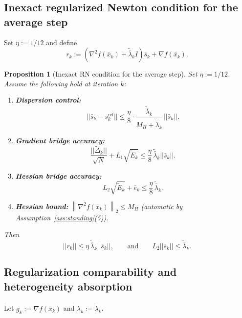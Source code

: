 \documentclass[11pt,a4paper]{article}
\def\norm#1{||#1||}%
\newtheorem{proposition}[theorem]{Proposition}
\newcommand{\norm}[1]{\left\|#1\right\|}
\newcommand{\normtwo}[1]{\left\|#1\right\|_2}
\begin{document}
	\subsection{Inexact regularized Newton condition for the average step}
	Set $\eta:=1/12$ and define
	\[
	r_k := (\nabla^2 f(\bar x_k)+\tilde{\bar\lambda}_k I)\bar s_k+\nabla f(\bar x_k).
	\]
	
	\begin{proposition}[Inexact RN condition for the average step]\label{prop:inexact-rn}
		Set $\eta:=1/12$.
		Assume the following hold at iteration $k$:
		\begin{enumerate}[leftmargin=1.2em,itemsep=2pt]
			\item \textbf{Dispersion control:}
			\[
			\norm{\bar s_k-s^{\mathrm{ref}}_k}\le \frac{\eta}{8}\cdot \frac{\tilde{\bar\lambda}_k}{M_H+\tilde{\bar\lambda}_k}\,\norm{\bar s_k}.
			\]
			\item \textbf{Gradient bridge accuracy:}
			\[
			\frac{\norm{\tilde\Delta_k}}{\sqrt N}+L_1\sqrt{\tilde E_k}\le \frac{\eta}{8}\,\tilde{\bar\lambda}_k\norm{\bar s_k}.
			\]
			\item \textbf{Hessian bridge accuracy:}
			\[
			L_2\sqrt{\tilde E_k}+\bar e_k\le \frac{\eta}{8}\,\tilde{\bar\lambda}_k.
			\]
			\item \textbf{Hessian bound:} $\normtwo{\nabla^2 f(\bar x_k)}\le M_H$ (automatic by Assumption~\ref{ass:standing}(5)).
		\end{enumerate}
		Then
		\[
		\norm{r_k}\le \eta\,\tilde{\bar\lambda}_k\norm{\bar s_k},
		\qquad\text{and}\qquad
		L_2\norm{\bar s_k}\le \tilde{\bar\lambda}_k.
		\]
	\end{proposition}
	
	\subsection{Regularization comparability and heterogeneity absorption}
	Let $g_k:=\nabla f(\bar x_k)$ and $\lambda_k:=\tilde{\bar\lambda}_k$.
	
\end{document}
